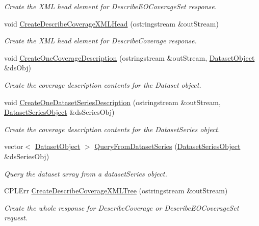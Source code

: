 \begin{DoxyCompactItemize}
\begin{DoxyCompactList}\small\item\em Create the XML head element for DescribeEOCoverageSet response. \end{DoxyCompactList}\item 
void \hyperlink{classWCS__DescribeCoverage_a385756678eac712ab993ac7a36d6c640}{CreateDescribeCoverageXMLHead} (ostringstream \&outStream)
\begin{DoxyCompactList}\small\item\em Create the XML head element for DescribeCoverage response. \end{DoxyCompactList}\item 
void \hyperlink{classWCS__DescribeCoverage_ab34c69c2877d1205e41b4d52c0c69ab8}{CreateOneCoverageDescription} (ostringstream \&outStream, \hyperlink{classDatasetObject}{DatasetObject} \&dsObj)
\begin{DoxyCompactList}\small\item\em Create the coverage description contents for the Dataset object. \end{DoxyCompactList}\item 
void \hyperlink{classWCS__DescribeCoverage_ae3f1103e9c8028ee5100c3c757c2f489}{CreateOneDatasetSeriesDescription} (ostringstream \&outStream, \hyperlink{classDatasetSeriesObject}{DatasetSeriesObject} \&dsSeriesObj)
\begin{DoxyCompactList}\small\item\em Create the coverage description contents for the DatasetSeries object. \end{DoxyCompactList}\item 
vector$<$ \hyperlink{classDatasetObject}{DatasetObject} $>$ \hyperlink{classWCS__DescribeCoverage_a33ceb7c235cfa5827444b7e27a1c72a9}{QueryFromDatasetSeries} (\hyperlink{classDatasetSeriesObject}{DatasetSeriesObject} \&dsSeriesObj)
\begin{DoxyCompactList}\small\item\em Query the dataset array from a datasetSeries object. \end{DoxyCompactList}\item 
CPLErr \hyperlink{classWCS__DescribeCoverage_ab5c7b3e04cbf771c2bcfb51d26d0c6ac}{CreateDescribeCoverageXMLTree} (ostringstream \&outStream)
\begin{DoxyCompactList}\small\item\em Create the whole response for DescribeCoverage or DescribeEOCoverageSet request. \end{DoxyCompactList}\end{DoxyCompactItemize}
